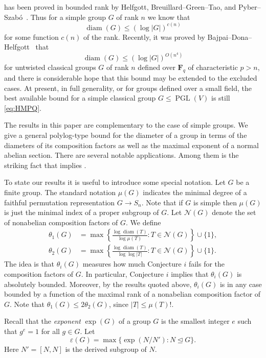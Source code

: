\documentclass[11pt,reqno]{amsart}
\numberwithin{equation}{section}
\theoremstyle{definition}
\theoremstyle{remark}
\def\F{\mathbf{F}} %
\newcommand\opr[1]{\operatorname{#1}}
\def\PGL{\opr{PGL}}
\def\diam{\opr{diam}}
\def\nsgp{\trianglelefteq}
\def\nacomp{\mathcal{N}}
\def\eps{\varepsilon}
\numberwithin{equation}{section}
\begin{document}
     has been proved in bounded rank by Helfgott, Breuillard--Green--Tao, and Pyber--Szab\'o~\cites{BGT11,pyber-szabo-2016}.
    Thus for a simple group $G$ of rank $n$ we know that
    \[
        \diam(G) \le (\log |G|)^{c(n)}
    \]
    for some function $c(n)$ of the rank.
    Recently, it was proved by Bajpai--Dona--Helfgott~\cite{BDH} that
    \[
        \diam(G) \le (\log |G|)^{O(n^4)}
    \]
    for untwisted classical groups $G$ of rank $n$ defined over $\F_q$ of characteristic $p > n$, and there is considerable hope that this bound may be extended to the excluded cases.
    At present, in full generality, or for groups defined over a small field, the best available bound for a simple classical group $G \le \PGL(V)$ is still \eqref{eq:HMPQ}.

    The results in this paper are complementary to the case of simple groups.
    We give a general polylog-type bound for the diameter of a group in terms of the diameters of its composition factors as well as the maximal exponent of a normal abelian section.
    There are several notable applications.
    Among them is the striking fact that  implies .

    To state our results it is useful to introduce some special notation.
    Let $G$ be a finite group.
    The standard notation $\mu(G)$ indicates the minimal degree of a faithful permutation representation $G \to S_n$.
    Note that if $G$ is simple then $\mu(G)$ is just the minimal index of a proper subgroup of $G$.
    Let $\nacomp(G)$ denote the set of nonabelian composition factors of $G$.
    We define
    \begin{align*}
        \theta_1(G) &= \max \left\{\frac{\log\diam(T)}{\log \mu(T)} : T \in \nacomp(G)\right\} \cup \{1\},\\
        \theta_2(G) &= \max \left\{\frac{\log\diam(T)}{\log \log |T|} : T \in \nacomp(G)\right\} \cup \{1\}.
    \end{align*}
    The idea is that $\theta_i(G)$ measures how much Conjecture $i$ fails for the composition factors of $G$.
    In particular, Conjecture $i$ implies that $\theta_i(G)$ is absolutely bounded.
    Moreover, by the results quoted above, $\theta_i(G)$ is in any case bounded by a function of the maximal rank of a nonabelian composition factor of $G$.
    Note that $\theta_1(G) \le 2 \theta_2(G)$, since $|T| \le \mu(T)!$.

    Recall that the \emph{exponent} $\exp(G)$ of a group $G$ is the smallest integer $e$ such that $g^e = 1$ for all $g \in G$.
    Let
    \[
        \eps(G) = \max \{\exp(N / N') : N \nsgp G\}.
    \]
    Here $N' = [N,N]$ is the derived subgroup of $N$.
\end{document}
